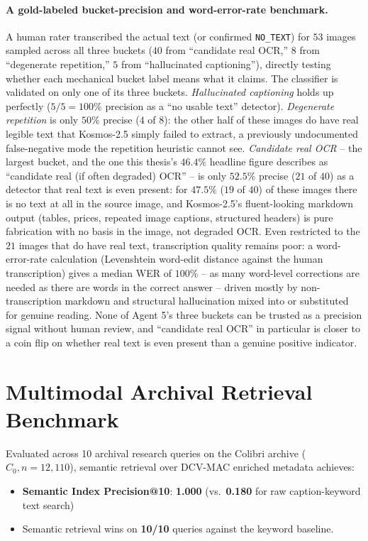 \documentclass[12pt,a4paper]{report}
\begin{document}
\paragraph{A gold-labeled bucket-precision and word-error-rate benchmark.} A human rater transcribed the actual text (or confirmed \texttt{NO\_TEXT}) for $53$ images sampled across all three buckets ($40$ from ``candidate real OCR,'' $8$ from ``degenerate repetition,'' $5$ from ``hallucinated captioning''), directly testing whether each mechanical bucket label means what it claims. The classifier is validated on only one of its three buckets. \textit{Hallucinated captioning} holds up perfectly ($5/5=100\%$ precision as a ``no usable text'' detector). \textit{Degenerate repetition} is only $50\%$ precise ($4$ of $8$): the other half of these images do have real legible text that Kosmos-2.5 simply failed to extract, a previously undocumented false-negative mode the repetition heuristic cannot see. \textit{Candidate real OCR} -- the largest bucket, and the one this thesis's $46.4\%$ headline figure describes as ``candidate real (if often degraded) OCR'' -- is only $52.5\%$ precise ($21$ of $40$) as a detector that real text is even present: for $47.5\%$ ($19$ of $40$) of these images there is no text at all in the source image, and Kosmos-2.5's fluent-looking markdown output (tables, prices, repeated image captions, structured headers) is pure fabrication with no basis in the image, not degraded OCR. Even restricted to the $21$ images that do have real text, transcription quality remains poor: a word-error-rate calculation (Levenshtein word-edit distance against the human transcription) gives a median WER of $100\%$ -- as many word-level corrections are needed as there are words in the correct answer -- driven mostly by non-transcription markdown and structural hallucination mixed into or substituted for genuine reading. None of Agent 5's three buckets can be trusted as a precision signal without human review, and ``candidate real OCR'' in particular is closer to a coin flip on whether real text is even present than a genuine positive indicator.

\section{Multimodal Archival Retrieval Benchmark}
\label{sec:retrieval_benchmark}
Evaluated across 10 archival research queries on the Colibri archive ($C_0, n=12,110$), semantic retrieval over DCV-MAC enriched metadata achieves:
\begin{itemize}
    \item \textbf{Semantic Index Precision@10}: \textbf{1.000} (vs.\ \textbf{0.180} for raw caption-keyword text search)
    \item Semantic retrieval wins on \textbf{10/10} queries against the keyword baseline.
\end{itemize}
\end{document}
